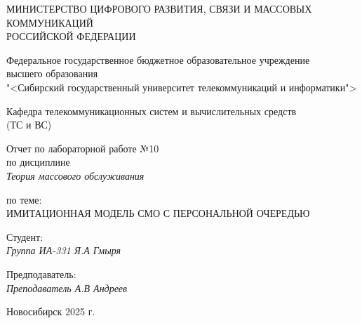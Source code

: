 \thispagestyle{empty}

\begin{center}
    МИНИСТЕРСТВО ЦИФРОВОГО РАЗВИТИЯ, СВЯЗИ И МАССОВЫХ КОММУНИКАЦИЙ \\ РОССИЙСКОЙ ФЕДЕРАЦИИ

    \vspace{20pt}

    Федеральное государственное бюджетное образовательное учреждение  \\  высшего образования \\
    "<Сибирский государственный университет телекоммуникаций и информатики"> \\

    \vspace{20pt}

    Кафедра телекоммуникационных систем и вычислительных средств \\  (ТС и ВС)
\end{center}

\vfill

\begin{center}
    Отчет по лабораторной работе №10 \\  
    по дисциплине \\
    \textit{Теория массового обслуживания}

    \vspace{20pt} 
    по теме: \\
    \uppercase{Имитационная модель СМО с персональной очередью}
\end{center}

\vfill

    \noindent Студент: \\
    \textit{Группа ИА-331 \hfill Я.А Гмыря}

    \vspace{20pt}

    \noindent Предподаватель: \\
    \textit{Преподаватель \hfill А.В Андреев}

\vfill

\begin{center}
    Новосибирск 2025 г.
\end{center}
